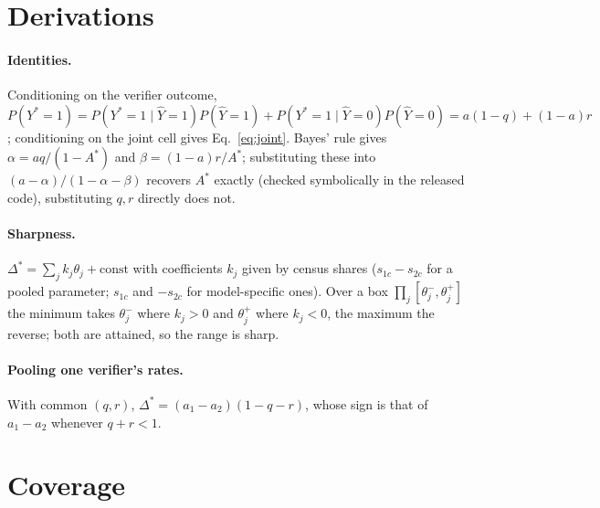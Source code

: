 \section{Derivations}
\label{sec:appendix-proofs}

\paragraph{Identities.} Conditioning on the verifier outcome,
$P(Y^\ast=1)=P(Y^\ast=1\mid\hat Y=1)P(\hat Y=1)+P(Y^\ast=1\mid\hat Y=0)P(\hat Y=0)
=a(1-q)+(1-a)r$; conditioning on the joint cell gives Eq.~\eqref{eq:joint}.
Bayes' rule gives $\alpha=aq/(1-A^\ast)$ and $\beta=(1-a)r/A^\ast$;
substituting these into $(a-\alpha)/(1-\alpha-\beta)$ recovers $A^\ast$
exactly (checked symbolically in the released code), substituting $q,r$
directly does not.

\paragraph{Sharpness.} $\Delta^\ast=\sum_j k_j\theta_j+\text{const}$ with
coefficients $k_j$ given by census shares ($s_{1c}-s_{2c}$ for a pooled
parameter; $s_{1c}$ and $-s_{2c}$ for model-specific ones). Over a box
$\prod_j[\theta_j^-,\theta_j^+]$ the minimum takes $\theta_j^-$ where
$k_j>0$ and $\theta_j^+$ where $k_j<0$, the maximum the reverse; both are
attained, so the range is sharp.

\paragraph{Pooling one verifier's rates.} With common $(q,r)$,
$\Delta^\ast=(a_1-a_2)(1-q-r)$, whose sign is that of $a_1-a_2$ whenever
$q+r<1$.

\section{Coverage}
\label{sec:appendix-coverage}

